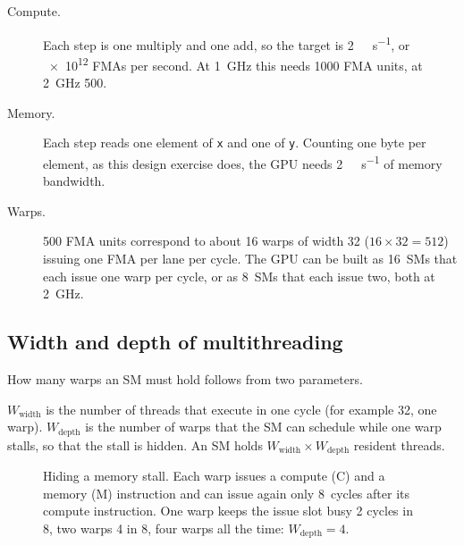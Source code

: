 \documentclass[../main.tex]{subfiles}
\begin{document}
\begin{description}
  \item[Compute.]  Each step is one multiply and one add, so the target
    is \SI{2}{\tera\flop\per\second}, or \num{e12} FMAs per second.  At
    \SI{1}{\giga\hertz} this needs \num{1000} FMA units, at
    \SI{2}{\giga\hertz} \num{500}.
  \item[Memory.]  Each step reads one element of \texttt{x} and one of
    \texttt{y}.  Counting one byte per element, as this design
    exercise does, the GPU needs \SI{2}{\tera\byte\per\second} of
    memory bandwidth.
  \item[Warps.]  \num{500} FMA units correspond to about 16 warps of
    width 32 ($16 \times 32 = 512$) issuing one FMA per lane per
    cycle.  The GPU can be built as 16~SMs that each issue one warp
    per cycle, or as 8~SMs that each issue two, both at
    \SI{2}{\giga\hertz}.
\end{description}

\subsection{Width and depth of multithreading}

How many warps an SM must hold follows from two parameters.

\begin{definition}
  \label{def:l08-wwidth-wdepth}
  $W_{\text{width}}$ is the number of threads that execute in one
  cycle (for example 32, one warp).  $W_{\text{depth}}$ is the number of
  warps that the SM can schedule while one warp stalls, so that the
  stall is hidden.  An SM holds
  $W_{\text{width}} \times W_{\text{depth}}$ resident threads.
\end{definition}

\begin{figure}[tb]
  \centering
  
  \caption{Hiding a memory stall.  Each warp issues a compute (C) and a
    memory (M) instruction and can issue again only 8~cycles after its
    compute instruction.  One warp keeps the issue slot busy 2 cycles
    in 8, two warps 4 in 8, four warps all the time:
    $W_{\text{depth}} = 4$.}
  \label{fig:l08-wdepth}
\end{figure}
\end{document}
